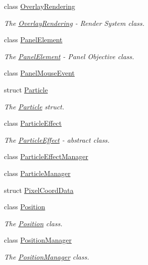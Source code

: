 \begin{DoxyCompactItemize}
class \hyperlink{classEngine_1_1OverlayRendering}{Overlay\+Rendering}
\begin{DoxyCompactList}\small\item\em The \hyperlink{classEngine_1_1OverlayRendering}{Overlay\+Rendering} -\/ Render System class. \end{DoxyCompactList}\item 
class \hyperlink{classEngine_1_1PanelElement}{Panel\+Element}
\begin{DoxyCompactList}\small\item\em The \hyperlink{classEngine_1_1PanelElement}{Panel\+Element} -\/ Panel Objective class. \end{DoxyCompactList}\item 
class \hyperlink{classEngine_1_1PanelMouseEvent}{Panel\+Mouse\+Event}
\item 
struct \hyperlink{structEngine_1_1Particle}{Particle}
\begin{DoxyCompactList}\small\item\em The \hyperlink{structEngine_1_1Particle}{Particle} struct. \end{DoxyCompactList}\item 
class \hyperlink{classEngine_1_1ParticleEffect}{Particle\+Effect}
\begin{DoxyCompactList}\small\item\em The \hyperlink{classEngine_1_1ParticleEffect}{Particle\+Effect} -\/ abstract class. \end{DoxyCompactList}\item 
class \hyperlink{classEngine_1_1ParticleEffectManager}{Particle\+Effect\+Manager}
\item 
class \hyperlink{classEngine_1_1ParticleManager}{Particle\+Manager}
\item 
struct \hyperlink{structEngine_1_1PixelCoordData}{Pixel\+Coord\+Data}
\item 
class \hyperlink{classEngine_1_1Position}{Position}
\begin{DoxyCompactList}\small\item\em The \hyperlink{classEngine_1_1Position}{Position} class. \end{DoxyCompactList}\item 
class \hyperlink{classEngine_1_1PositionManager}{Position\+Manager}
\begin{DoxyCompactList}\small\item\em The \hyperlink{classEngine_1_1PositionManager}{Position\+Manager} class. \end{DoxyCompactList}\item 

\end{DoxyCompactItemize}
